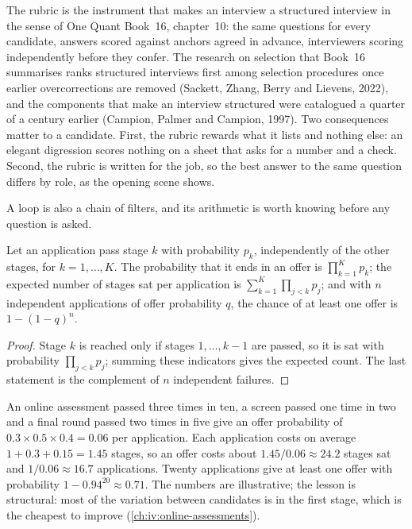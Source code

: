 The rubric is the instrument that makes an interview a structured interview in the sense of One Quant
Book~16, chapter~10: the same questions for every candidate, answers scored against anchors agreed in
advance, interviewers scoring independently before they confer. The research on selection that Book~16
summarises ranks structured interviews first among selection procedures once earlier overcorrections are
removed (Sackett, Zhang, Berry and Lievens, 2022), and the components that make an interview structured were
catalogued a quarter of a century earlier (Campion, Palmer and Campion, 1997). Two consequences matter to a
candidate. First, the rubric rewards what it lists and nothing else: an elegant digression scores nothing on
a sheet that asks for a number and a check. Second, the rubric is written for the job, so the best answer to
the same question differs by role, as the opening scene shows.

A loop is also a chain of filters, and its arithmetic is worth knowing before any question is asked.

\begin{proposition}\label{prop:iv:what-each-interview-tests-by-role:funnel}
Let an application pass stage $k$ with probability $p_k$, independently of the other stages, for
$k = 1, \dots, K$. The probability that it ends in an offer is $\prod_{k=1}^K p_k$; the expected number of
stages sat per application is $\sum_{k=1}^{K} \prod_{j<k} p_j$; and with $n$ independent applications of offer
probability $q$, the chance of at least one offer is $1 - (1-q)^n$.
\end{proposition}

\begin{proof}
Stage $k$ is reached only if stages $1, \dots, k-1$ are passed, so it is sat with probability
$\prod_{j<k} p_j$; summing these indicators gives the expected count. The last statement is the complement of
$n$ independent failures.
\end{proof}

\begin{example}\label{ex:iv:what-each-interview-tests-by-role:funnel}
An online assessment passed three times in ten, a screen passed one time in two and a final round passed two
times in five give an offer probability of $0.3 \times 0.5 \times 0.4 = 0.06$ per application. Each
application costs on average $1 + 0.3 + 0.15 = 1.45$ stages, so an offer costs about $1.45/0.06 \approx 24.2$
stages sat and $1/0.06 \approx 16.7$ applications. Twenty applications give at least one offer with
probability $1 - 0.94^{20} \approx 0.71$. The numbers are illustrative; the lesson is structural: most of the
variation between candidates is in the first stage, which is the cheapest to improve
(\cref{ch:iv:online-assessments}).
\end{example}

